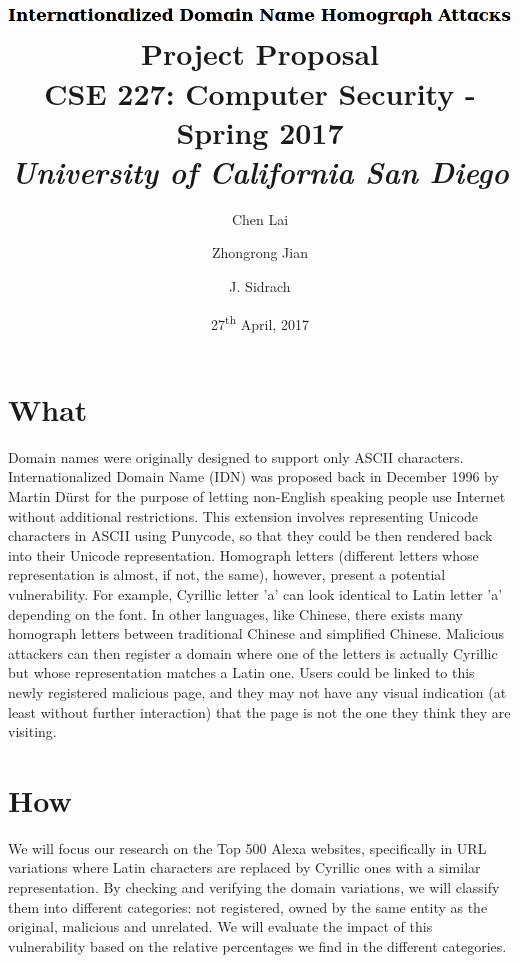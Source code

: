 \documentclass[letterpaper,twocolumn,10pt]{article}
\begin{document}
\date{27\textsuperscript{th} April, 2017}

\title{\Large \textbf{
\includegraphics[height=\baselineskip]{title} \\
Project Proposal } \\ \vspace{0.025 in} \large \normalfont
CSE 227: Computer Security - Spring 2017 \\ \textit{
University of California San Diego
}}

\author{
{\rm Chen Lai}\\
\and
{\rm Zhongrong Jian}\\
\and
{\rm J. Sidrach}\\
}

\maketitle

\section{What}

Domain names were originally designed to support only ASCII characters.
Internationalized Domain Name (IDN) was proposed back in December 1996 by Martin Dürst for the purpose of letting non-English speaking people use Internet without additional restrictions.
This extension involves representing Unicode characters in ASCII using Punycode, so that they could be then rendered back into their Unicode representation.
Homograph letters (different letters whose representation is almost, if not, the same), however, present a potential vulnerability.
For example, Cyrillic letter 'a' can look identical to Latin letter 'a' depending on the font.
In other languages, like Chinese, there exists many homograph letters between traditional Chinese and simplified Chinese.
Malicious attackers can then register a domain where one of the letters is actually Cyrillic but whose representation matches a Latin one.
Users could be linked to this newly registered malicious page, and they may not have any visual indication (at least without further interaction) that the page is not the one they think they are visiting.

\section{How}
We will focus our research on the Top 500 Alexa websites, specifically in URL variations where Latin characters are replaced by Cyrillic ones with a similar representation.
By checking and verifying the domain variations, we will classify them into different categories: not registered, owned by the same entity as the original, malicious and unrelated.
We will evaluate the impact of this vulnerability based on the relative percentages we find in the different categories.
\end{document}
